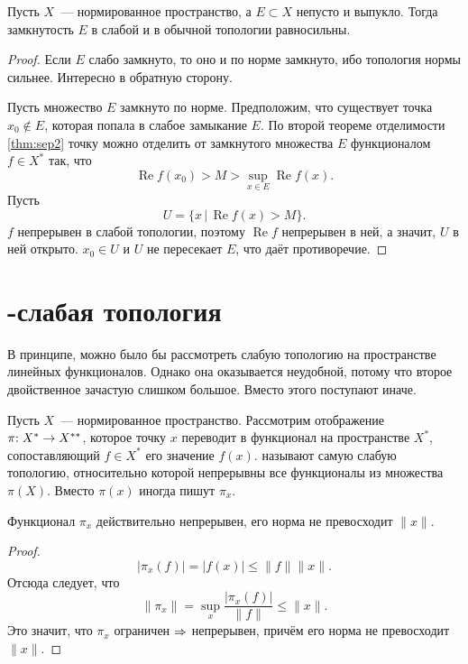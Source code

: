 \documentclass{notes}
\DeclareMathOperator{\re}{Re}
\newcommand{\ta}{$*$}
\begin{document}
	\begin{thm}[Мазура] \label{thm:mas}
		Пусть $X$~--- нормированное пространство, а $E \subset X$ непусто и выпукло. Тогда замкнутость $E$ в слабой и в обычной топологии равносильны.
		\begin{proof}
			Если $E$ слабо замкнуто, то оно и по норме замкнуто, ибо топология нормы сильнее. Интересно в обратную сторону.

			Пусть множество $E$ замкнуто по норме. Предположим, что существует точка $x_0 \notin E$, которая попала в слабое замыкание $E$. По второй теореме отделимости \ref{thm:sep2} точку можно отделить от замкнутого множества $E$ функционалом $f \in X^{*}$ так, что 
			\[
				\re f(x_0) > M > \sup\limits_{x \in E} \re f(x).
			\]
			Пусть 
			\[
				U = \{x \, | \, \re f(x) > M\}.
			\]
			$f$ непрерывен в слабой топологии, поэтому $\re f$ непрерывен в ней, а значит, $U$ в ней открыто. $x_0 \in U$ и $U$ не пересекает $E$, что даёт противоречие.
		\end{proof}
	\end{thm}

\section{\textasteriskcentered-слабая топология}

	В принципе, можно было бы рассмотреть слабую топологию на пространстве линейных функционалов. Однако она оказывается неудобной, потому что второе двойственное зачастую слишком большое. Вместо этого поступают иначе.

	\begin{de}
		Пусть $X$~--- нормированное пространство. Рассмотрим отображение $\pi\text{\text{:}} \; X^* \to X^{**}$, которое точку $x$ переводит в функционал на пространстве $X^{*}$, сопоставляющий $f \in X^{*}$ его значение $f(x)$. \ti{\ta-слабой топологией} называют самую слабую топологию, относительно которой непрерывны все функционалы из множества $\pi(X)$.
		Вместо $\pi(x)$ иногда пишут $\pi_x$.
	\end{de}

	\begin{st}[Корректность]
		\label{st:cor-sweak}
		Функционал $\pi_x$ действительно непрерывен, его норма не превосходит $\|x\|$.
		\begin{proof}
			\[
				\big|\pi_x(f)\big| = \big|f(x)\big| \leqslant \|f\| \|x\|.
			\]
			Отсюда следует, что
			\[
				\|\pi_x\| = \sup\limits_x \dfrac{\big|\pi_x(f)\big|}{\|f\|} \leqslant \|x\|.
			\]
			Это значит, что $\pi_x$ ограничен $\Rightarrow$ непрерывен, причём его норма не превосходит $\|x\|$.
		\end{proof}
	\end{st}
\end{document}
